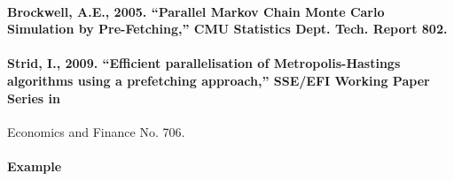 \paragraph{Brockwell, A.E., 2005. ``Parallel Markov Chain Monte Carlo
Simulation by Pre-Fetching,'' CMU Statistics Dept. Tech. Report
802.}\label{brockwell-a.e.-2005.-parallel-markov-chain-monte-carlo-simulation-by-pre-fetching-cmu-statistics-dept.-tech.-report-802.}

\paragraph{Strid, I., 2009. ``Efficient parallelisation of
Metropolis-Hastings algorithms using a prefetching approach,'' SSE/EFI
Working Paper Series
in}\label{strid-i.-2009.-efficient-parallelisation-of-metropolis-hastings-algorithms-using-a-prefetching-approach-sseefi-working-paper-series-in}

Economics and Finance No. 706.

\paragraph{Example}\label{example}


